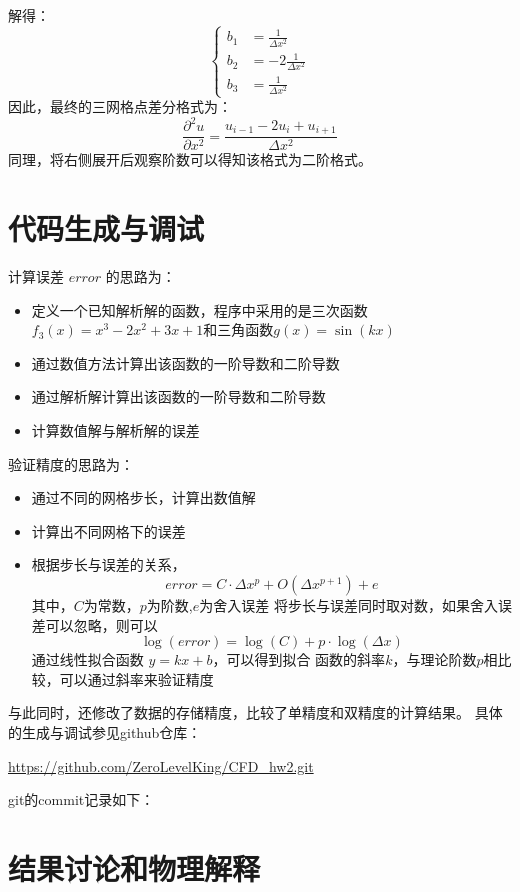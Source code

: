 \documentclass[UTF8]{ctexart}
\begin{document}
解得：
\begin{equation}
    \begin{cases}
        b_1 &=  \frac{1}{\Delta x^2}\\
        b_2 &=  -2\frac{1}{\Delta x^2}\\
        b_3 &=  \frac{1}{\Delta x^2}
    \end{cases}
\end{equation}
因此，最终的三网格点差分格式为：
\begin{equation}
    \frac{\partial^2 u}{\partial x^2} = \frac{u_{i-1} - 2u_i + u_{i+1}}{\Delta x^2}
\end{equation}
同理，将右侧展开后观察阶数可以得知该格式为二阶格式。


\section{代码生成与调试}
计算误差 $error$ 的思路为：
\begin{itemize}
    \item 定义一个已知解析解的函数，程序中采用的是三次函数$f_3(x) = x^3 - 2x^2 + 3x + 1$和三角函数$g(x) = \sin(kx)$
    \item 通过数值方法计算出该函数的一阶导数和二阶导数
    \item 通过解析解计算出该函数的一阶导数和二阶导数
    \item 计算数值解与解析解的误差
\end{itemize}
验证精度的思路为：
\begin{itemize}
    \item 通过不同的网格步长，计算出数值解
    \item 计算出不同网格下的误差
    \item 根据步长与误差的关系，
    \begin{equation}
        error = C \cdot \Delta x^p + O(\Delta x^{p+1}) + e
    \end{equation}
    其中，$C$为常数，$p$为阶数,$e$为舍入误差
    将步长与误差同时取对数，如果舍入误差可以忽略，则可以
    \begin{equation}
        \log(error) = \log(C) + p \cdot \log(\Delta x)
    \end{equation}
    通过线性拟合函数 $y = kx + b$，可以得到拟合
    函数的斜率$k$，与理论阶数$p$相比较，可以通过斜率来验证精度
\end{itemize}
与此同时，还修改了数据的存储精度，比较了单精度和双精度的计算结果。
具体的生成与调试参见github仓库：
\begin{center}
    \url{https://github.com/ZeroLevelKing/CFD_hw2.git}
\end{center}
git的commit记录如下：
\section{结果讨论和物理解释}
\end{document}
